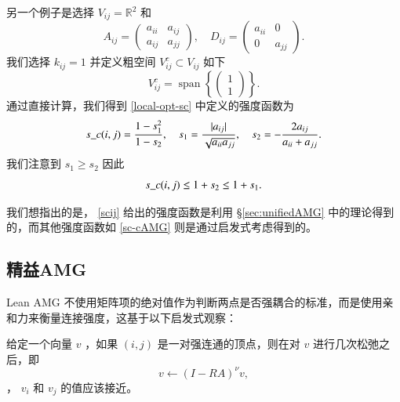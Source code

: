 \documentclass[12pt]{acta_2011xz}
\begin{document}
另一个例子是选择    $V_{ij}=\mathbb{R}^2$    和 
   \begin{equation*}
    A_{ij}=  \begin{pmatrix}
        a_{ii} & a_{ij} \\ 
        a_{ij} & a_{jj}
    \end{pmatrix}, \quad
        D_{ij}= \begin{pmatrix}
        a_{ii} & 0 \\ 
        0 & a_{jj}
    \end{pmatrix}.
\end{equation*}    我们选择    $k_{ij}=1$    并定义粗空间    $V_{ij}^c\subset V_{ij}$    如下
   \begin{equation*}
    V_{ij}^c=\operatorname{span}\left \{  \begin{pmatrix}
        1 \\ 
        1
    \end{pmatrix}  \right \} .
\end{equation*}    通过直接计算，我们得到    \eqref{local-opt-sc}    中定义的强度函数为 
   \begin{equation}\label{scij}
s\_c(i, j)= \frac{1-s_1^2}{1-s_2}, \quad s_1=\frac{|a_{ij}|}{\sqrt{a_{ii}a_{jj}}}, \quad s_2=-\frac{2a_{ij}}{a_{ii}+a_{jj}}.
\end{equation}    我们注意到    $s_1\ge s_2$    因此
   \begin{equation}\label{e:s1s2}
        s\_c(i, j) \le 1+s_2 \le 1+s_1.
    \end{equation}     

我们想指出的是，
   \eqref{scij}    给出的强度函数是利用
   \S       \ref{sec:unifiedAMG}    中的理论得到的，而其他强度函数如
   \eqref{sc-cAMG}    则是通过启发式考虑得到的。  

   \subsection{精益AMG  }    Lean AMG 不使用矩阵项的绝对值作为判断两点是否强耦合的标准，而是使用亲和力来衡量连接强度，这基于以下启发式观察：  

给定一个向量    $v$    ，如果    $(i, j)$    是一对强连通的顶点，则在对    $v$    进行几次松弛之后，即
   \begin{equation*}
    v\leftarrow (I-RA)^{\nu}v,
\end{equation*}    ，    $v_i$    和    $v_j$    的值应该接近。  
\end{document}

